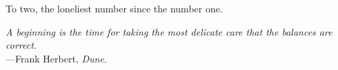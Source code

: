 %
\begin{frontmatter}

%
%
\makefrontmatter 

%
%   
%
%
%
%
\begin{dedication} 
  To two, the loneliest number since the number one.
\end{dedication}


%   
% 



%
%
\begin{epigraph} %
  \emph{A beginning is the time for taking the most delicate care that the balances are correct.}\\
  ---Frank Herbert, \textit{Dune}.
\end{epigraph}

% 



\end{frontmatter}
